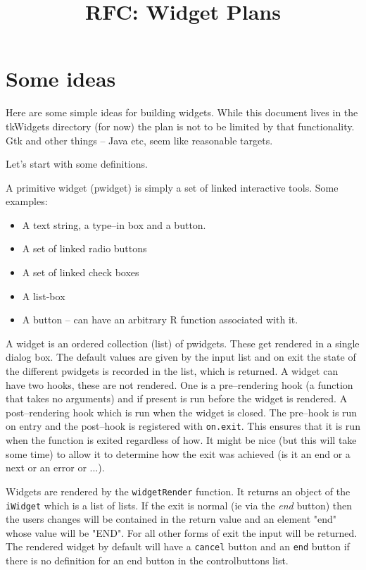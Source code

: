 \documentclass{article}
\begin{document}
\title{RFC: Widget Plans}
\maketitle


\section*{Some ideas}

Here are some simple ideas for building widgets. While this document
lives in the tkWidgets directory (for now) the plan is not to be
limited by that functionality. Gtk and other things -- Java etc,
seem like reasonable targets.

Let's start with some definitions.

A primitive widget (pwidget) is simply a set of linked interactive
tools.
Some examples:
\begin{itemize}
\item A text string, a type--in box and a button.
\item A set of linked radio buttons
\item A set of linked check boxes
\item A list-box
\item A button -- can have an arbitrary R function associated with it.
\end{itemize}

A widget is an ordered collection (list) of pwidgets.
These get rendered in a single dialog box.
The default values are given by the input list and on exit the state
of the different pwidgets is recorded in the list, which is returned.
A widget can have two hooks, these are not rendered. One is a
pre--rendering hook (a function that takes no arguments) and if
present is run before the widget is rendered.
A post--rendering hook which is run when the widget is closed.
The pre--hook is run on entry and the post--hook is registered with 
\verb+on.exit+. This ensures that it is run when the function is
exited regardless of how. It might be nice (but this will take some
time) to allow it to determine how the exit was achieved (is it an end
or a next or an error or ...).

Widgets are rendered by the \verb+widgetRender+ function.
It returns an object of the \verb+iWidget+ which is a list of
lists. If the exit is normal (ie via the {\em end} button) then the
users changes will be contained in the return value and an element
"end" whose value will be "END". For all other forms of exit the input
will be returned. The rendered widget by default will have a
\verb+cancel+ button and an \verb+end+ button if there is no
definition for an end button in the controlbuttons list. 
\end{document}
